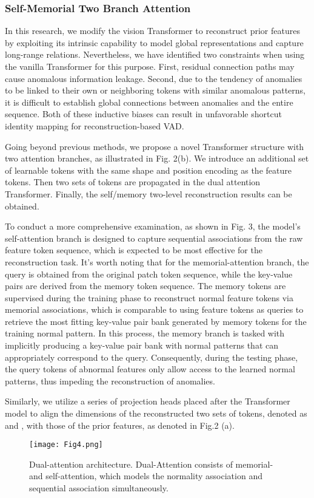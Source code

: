 \documentclass[journal]{IEEEtran}
\begin{document}
\subsubsection{Self-Memorial Two Branch Attention}

In this research, we modify the vision Transformer to reconstruct prior features by exploiting its intrinsic capability to model global representations and capture long-range relations. Nevertheless, we have identified two constraints when using the vanilla Transformer for this purpose. First, residual connection paths may cause anomalous information leakage. Second, due to the tendency of anomalies to be linked to their own or neighboring tokens with similar anomalous patterns, it is difficult to establish global connections between anomalies and the entire sequence. Both of these inductive biases can result in unfavorable shortcut identity mapping for reconstruction-based VAD.

Going beyond previous methods, we propose a novel Transformer structure with two attention branches, as illustrated in Fig. 2(b). We introduce an additional set of learnable tokens with the same shape and position encoding as the feature tokens. Then two sets of tokens are propagated in the dual attention Transformer. Finally, the self/memory two-level reconstruction results can be obtained.

To conduct a more comprehensive examination, as shown in Fig. 3, the model's self-attention branch is designed to capture sequential associations from the raw feature token sequence, which is expected to be most effective for the reconstruction task. It's worth noting that for the memorial-attention branch, the query is obtained from the original patch token sequence, while the key-value pairs are derived from the memory token sequence. The memory tokens are supervised during the training phase to reconstruct normal feature tokens via memorial associations, which is comparable to using feature tokens as queries to retrieve the most fitting key-value pair bank generated by memory tokens for the training normal pattern. In this process, the memory branch is tasked with implicitly producing a key-value pair bank with normal patterns that can appropriately correspond to the query. Consequently, during the testing phase, the query tokens of abnormal features only allow access to the learned normal patterns, thus impeding the reconstruction of anomalies.

Similarly, we utilize a series of projection heads placed after the Transformer model to align the dimensions of the reconstructed two sets of tokens, denoted as  and , with those of the prior features, as denoted in Fig.2 (a).
\begin{figure}[t]
\centerline{\texttt{[image: Fig4.png]}}
\caption[width=8.8cm]{Dual-attention architecture. Dual-Attention consists of memorial- and self-attention, which models the normality association and sequential association simultaneously.
}
\label{fig1}
\end{figure}
\end{document}
